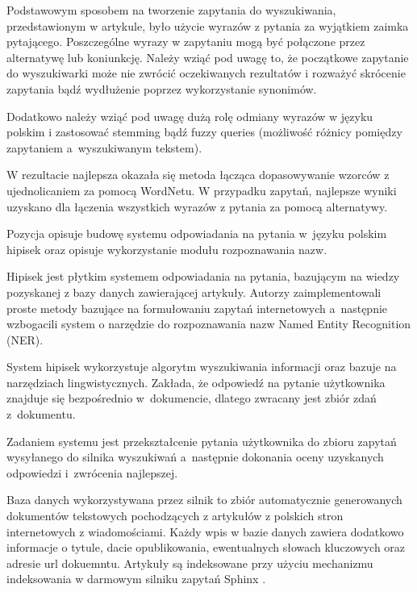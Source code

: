 Podstawowym sposobem na tworzenie zapytania do wyszukiwania, przedstawionym w artykule, było użycie wyrazów z pytania za wyjątkiem zaimka pytającego. Poszczególne wyrazy w zapytaniu mogą być połączone przez alternatywę lub koniunkcję. Należy wziąć pod uwagę to, że początkowe zapytanie do wyszukiwarki może nie zwrócić oczekiwanych rezultatów i rozważyć skrócenie zapytania bądź wydłużenie poprzez wykorzystanie synonimów. 

Dodatkowo należy wziąć pod uwagę dużą rolę odmiany wyrazów w języku polskim i zastosować stemming bądź fuzzy queries (możliwość różnicy pomiędzy zapytaniem a~wyszukiwanym tekstem).

W rezultacie najlepsza okazała się metoda łącząca dopasowywanie wzorców z ujednolicaniem za pomocą WordNetu. W przypadku zapytań, najlepsze wyniki uzyskano dla łączenia wszystkich wyrazów z pytania za pomocą alternatywy\cite{przybyla-2013-question}. 

Pozycja \cite{polishQAS} opisuje budowę systemu odpowiadania na pytania w~języku polskim hipisek oraz opisuje wykorzystanie modułu rozpoznawania nazw.

Hipisek jest płytkim systemem odpowiadania na pytania, bazującym na wiedzy pozyskanej z bazy danych zawierającej artykuły. Autorzy zaimplementowali proste metody bazujące na formułowaniu zapytań internetowych a~następnie wzbogacili system o narzędzie do rozpoznawania nazw Named Entity Recognition (NER). 

System hipisek wykorzystuje algorytm wyszukiwania informacji oraz bazuje na narzędziach lingwistycznych. Zakłada, że odpowiedź na pytanie użytkownika znajduje się bezpośrednio w~dokumencie, dlatego zwracany jest zbiór zdań z~dokumentu.

Zadaniem systemu jest przekształcenie pytania użytkownika do zbioru zapytań wysyłanego do silnika wyszukiwań a~następnie dokonania oceny uzyskanych odpowiedzi i~zwrócenia najlepszej.

Baza danych wykorzystywana przez silnik to zbiór automatycznie generowanych dokumentów tekstowych pochodzących z artykułów z polskich stron internetowych z wiadomościami. Każdy wpis w bazie danych zawiera dodatkowo informacje o tytule, dacie opublikowania, ewentualnych słowach kluczowych oraz adresie url dokuemntu. Artykuły są indeksowane przy użyciu mechanizmu indeksowania w darmowym silniku zapytań Sphinx \cite{sphinx}. 

